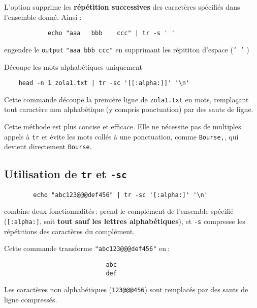 \documentclass[a4paper]{report}
\begin{document}
    \begin{note}{}{}
        L'option  supprime les \textbf{répétition successives} 
        des caractères spécifiés dans l'ensemble donné. Ainsi :
        \begin{verbatim}
            echo "aaa   bbb    ccc" | tr -s ' '
        \end{verbatim}
        engendre le \texttt{output} \texttt{"aaa bbb ccc"} en supprimant les répititon d'espace 
        (\texttt{' '} )
    \end{note}

    \begin{EExample}{Découpe les mots alphabétiques uniquement}{}
        \begin{verbatim}
    head -n 1 zola1.txt | tr -sc '[[:alpha:]]' '\n'
        \end{verbatim}
        Cette commande découpe la première ligne de \texttt{zola1.txt} en mots, 
        remplaçant tout caractère non alphabétique (y compris ponctuation) par des 
        sauts de ligne.

        \vspace{0.5em}

        \noindent{}  
        Cette méthode est plus concise et efficace. Elle ne nécessite pas de 
        multiples appels à \texttt{tr} et évite les mots collés à une ponctuation, 
        comme \texttt{Bourse,}, qui devient directement \texttt{Bourse}.
    \end{EExample}



    \subsection{Utilisation de \texttt{tr} et \texttt{-sc}}
    \begin{note}{}{}
        \begin{verbatim}
        echo "abc123@@@def456" | tr -sc '[:alpha:]' '\n'
        \end{verbatim}
        \noindent{} combine deux fonctionnalités :
         prend le complément de l’ensemble spécifié (\texttt{[:alpha:]}, soit
        \textbf{tout sauf les lettres alphabétiques}), et \texttt{-s} compresse les répétitions
        des caractères du complément. 

        \vspace{0.5em}

        \noindent Cette commande transforme \texttt{"abc123@@@def456"} en :
        \begin{center}
             \begin{verbatim}
                            abc
                            def
            \end{verbatim}
        \end{center}
        Les caractères non alphabétiques (\texttt{123@@@456}) sont remplacés par des
        sauts de ligne compressés.
    \end{note}
\end{document}
